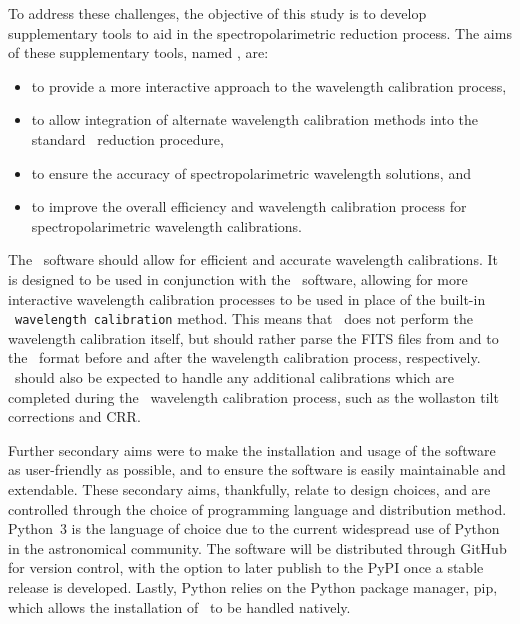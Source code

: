 To address these challenges, the objective of this study is to develop supplementary tools to aid in the spectro\-polarimetric reduction process.
The aims of these supplementary tools, named \stops, are:
\begin{itemize}
    \item to provide a more interactive approach to the wavelength calibration process,
    \item to allow integration of alternate wavelength calibration methods into the standard \polsalt\ reduction procedure,
    \item to ensure the accuracy of spectropolarimetric wavelength solutions, and
    \item to improve the overall efficiency and wavelength calibration process for spectro\-polarimetric wavelength calibrations.
\end{itemize}
The \stops\ software should allow for efficient and accurate wavelength calibrations.
It is designed to be used in conjunction with the \polsalt\ software, allowing for more interactive wavelength calibration processes to be used in place of the built-in \polsalt\ \texttt{wavelength calibration} method.
This means that \stops\ does not perform the wavelength calibration itself, but should rather parse the \gls{FITS} files from and to the \polsalt\ format before and after the wavelength calibration process, respectively.
\stops\ should also be expected to handle any additional calibrations which are completed during the \polsalt\ wavelength calibration process, such as the wollaston tilt corrections and \gls{CRR}.

Further secondary aims were to make the installation and usage of the software as user-friendly as possible, and to ensure the software is easily maintainable and extendable.
These secondary aims, thankfully, relate to design choices, and are controlled through the choice of programming language and distribution method.
Python~$3$ is the language of choice due to the current widespread use of Python in the astronomical community.
The software will be distributed through GitHub for version control, with the option to later publish to the \gls{PyPI} once a stable release is developed.
Lastly, Python relies on the Python package manager, pip, which allows the installation of \stops\ to be handled natively.

